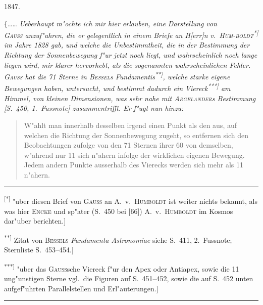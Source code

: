\documentclass[12pt,a4paper]{article}
\theoremstyle{plain}
\theoremstyle{definition}
\theoremstyle{remark}
\begin{document}
{\vspace{1em}
\begin{flushright}
1847.
\end{flushright}

\noindent
$\{$\ldots{}\ldots{} {\itshape Ueberhaupt m"ochte ich mir hier erlauben, eine Darstellung von} \\ {\itshape \textsc{Gauss} anzuf"uhren, die er gelegentlich in einem Briefe an H[err]n v.\ \textsc{Hum-boldt}\textsuperscript{*]} im Jahre 1828 gab, und welche die Unbestimmtheit, die in der Bestimmung der Richtung der Sonnenbewegung f"ur jetzt noch liegt, und wahrscheinlich noch lange liegen wird, mir klarer hervorhebt, als die sogenannten wahrscheinlichen Fehler. \textsc{Gauss} hat die 71 Sterne in \textsc{Bessel}s {\itshape Fundamentis\textsuperscript{**]}}, welche starke eigene Bewegungen haben, untersucht, und bestimmt dadurch ein Viereck\textsuperscript{***]} am Himmel, von kleinen Dimensionen, was sehr nahe mit \textsc{Argelander}s Bestimmung [S.\ 450, 1.\ Fussnote] zusammentrifft. Er f"ugt nun hinzu:}

\begin{quote}
\glq{}W"ahlt man innerhalb desselben irgend einen Punkt als den aus, auf welchen die Richtung der Sonnenbewegung zugeht, so entfernen sich den Beobachtungen zufolge von den 71 Sternen ihrer 60 von demselben, w"ahrend nur 11 sich n"ahern infolge der wirklichen eigenen Bewegung. Jedem andern Punkte ausserhalb des Vierecks werden sich mehr als 11 n"ahern.\grq{}
\end{quote}

\rule{\textwidth}{0.4pt}
{\small
\textsuperscript{[*]} "uber diesen Brief von \textsc{Gauss} an A.\ v.\ \textsc{Humboldt} ist weiter nichts bekannt, als was hier \textsc{Encke} und sp"ater (S.\ 450 bei [66]) A.\ v.\ \textsc{Humboldt} im \glq{}Kosmos\grq{} dar"uber berichten.]

\textsuperscript{**]} Zitat von \textsc{Bessels} {\itshape Fundamenta Astronomiae} siehe S.\ 411, 2.\ Fussnote; Sternliste S.\ 453--454.]

\textsuperscript{***]} "uber das \textsc{Gau\ss}sche Viereck f"ur den Apex oder Antiapex, sowie die 11 ung"unstigen Sterne vgl.\ die Figuren auf S.\ 451--452, sowie die auf S.\ 452 unten aufgef"uhrten Parallelstellen und Erl"auterungen.]
}
\rule{\textwidth}{0.4pt}

}
\end{document}

